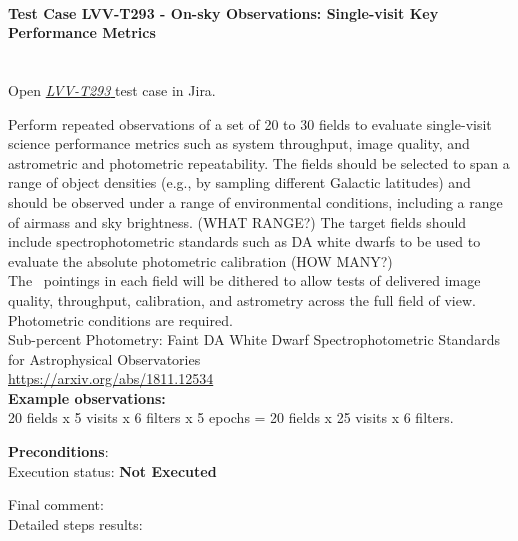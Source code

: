 \documentclass[DM,lsstdraft,STR,toc]{lsstdoc}
\begin{document}
\paragraph{Test Case LVV-T293 - On-sky Observations: Single-visit Key Performance Metrics
 }\mbox{}\\

Open  \href{https://jira.lsstcorp.org/secure/Tests.jspa#/testCase/LVV-T293}{\textit{ LVV-T293 } }
test case in Jira.

Perform repeated observations of a set of 20 to 30 fields to evaluate
single-visit science performance metrics such as system throughput,
image quality, and astrometric and photometric repeatability. The fields
should be selected to span a range of object densities (e.g., by
sampling different Galactic latitudes) and should be observed under a
range of environmental conditions, including a range of airmass and sky
brightness. (WHAT RANGE?) The target fields should include
spectrophotometric standards such as DA white dwarfs to be used to
evaluate the absolute photometric calibration (HOW
MANY?)\\[2\baselineskip]The ~pointings in each field will be dithered to
allow tests of delivered image quality, throughput, calibration, and
astrometry across the full field of view. Photometric conditions are
required.\\[2\baselineskip]Sub-percent Photometry: Faint DA White Dwarf
Spectrophotometric Standards for Astrophysical Observatories\\
\url{https://arxiv.org/abs/1811.12534}\\[2\baselineskip]\textbf{Example
observations:}\\
20 fields x 5 visits x 6 filters x 5 epochs = 20 fields x 25 visits x 6
filters.


\textbf{ Preconditions}:\\


Execution status: {\bf Not Executed }

Final comment:\\


Detailed steps results:
\end{document}
